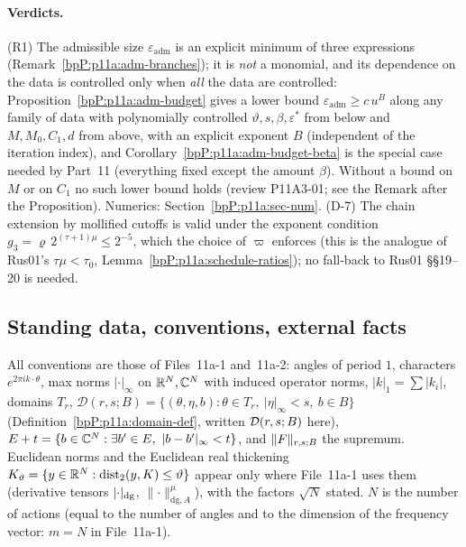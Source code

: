 \paragraph{Verdicts.} (R1) The admissible size $\varepsilon_{\mathrm{adm}}$ is an explicit minimum of three expressions (Remark~\ref{bpP:p11a:adm-branches}); it is \emph{not} a monomial, and its dependence on the data is controlled only when \emph{all} the data are controlled: Proposition~\ref{bpP:p11a:adm-budget} gives a lower bound $\varepsilon_{\mathrm{adm}}\ge c\,u^{B}$ along any family of data with polynomially controlled $\vartheta,s,\beta,\varepsilon^*$ from below and $M,M_0,C_1,d$ from above, with an explicit exponent $B$ (independent of the iteration index), and Corollary~\ref{bpP:p11a:adm-budget-beta} is the special case needed by Part~11 (everything fixed except the amount $\beta$). Without a bound on $M$ or on $C_1$ no such lower bound holds (review P11A3-01; see the Remark after the Proposition). Numerics: Section~\ref{bpP:p11a:sec-num}. (D-7) The chain extension by mollified cutoffs is valid under the exponent condition $g_3=\varrho\,2^{(\tau+1)\mu}\le2^{-5}$, which the choice of $\varpi$ enforces (this is the analogue of Rus01's $\tau\mu<\tau_0$, Lemma~\ref{bpP:p11a:schedule-ratios}); no fall-back to Rus01 \S\S19--20 is needed.

\subsection{Standing data, conventions, external facts}\label{bpP:p11a:s3-conv}

All conventions are those of Files~11a-1 and~11a-2: angles of period $1$, characters $e^{2\pi ik\cdot\theta}$, max norms $\lvert\cdot\rvert_\infty$ on $\mathbb{R}^N,\mathbb{C}^N$ with induced operator norms, $\lvert k\rvert_1=\sum\lvert k_i\rvert$, domains $T_r$, $\mathcal D(r,s;B)=\{(\theta,\eta,b):\theta\in T_r,\ \lvert\eta\rvert_\infty<s,\ b\in B\}$ (Definition~\ref{bpP:p11a:domain-def}, written $\mathcal D(r,s;B)$ here), $E+t=\{b\in\mathbb{C}^N:\exists b'\in E,\ \lvert b-b'\rvert_\infty<t\}$, and $\lVert F\rVert_{r,s;B}$ the supremum. Euclidean norms and the Euclidean real thickening $K_\vartheta=\{y\in\mathbb{R}^N:\operatorname{dist}_2(y,K)\le\vartheta\}$ appear only where File~11a-1 uses them (derivative tensors $\lvert \cdot\rvert_{\mathrm{dg}}$, $\lVert\cdot\rVert^\mu_{\mathrm{dg},A}$), with the factors $\sqrt N$ stated. $N$ is the number of actions (equal to the number of angles and to the dimension of the frequency vector: $m=N$ in File~11a-1).

